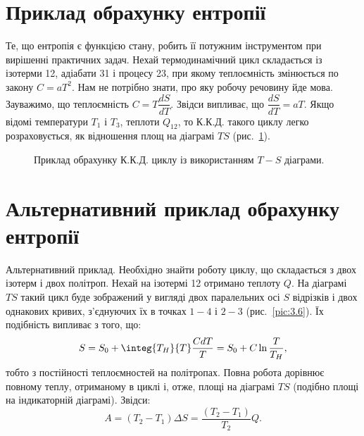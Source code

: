 \section{Приклад обрахунку ентропії}

Те, що ентропія є функцією стану, робить її потужним інструментом при вирішенні практичних задач.
Нехай термодинамічний цикл складається із ізотерми 12, адіабати 31 і процесу 23, при якому
теплоємність змінюється по закону $C=aT^2$. Нам не потрібно знати, про яку робочу речовину йде мова.
Зауважимо, що теплоємність $C = T \dfrac{dS}{dT}$. Звідси випливає, що $\dfrac{dS}{dT} = aT$. Якщо
відомі температури $T_1$ і $T_3$, теплоти $Q_{12}$, то К.К.Д. такого циклу легко розраховується, як
відношення площ на діаграмі $TS$ (рис.~\ref{tikz:3.6}).

\begin{figure}[h!]\centering

\caption{Приклад обрахунку К.К.Д. циклу із використанням $T-S$ діаграми.}
\label{tikz:3.6}
\end{figure}


\section{Альтернативний приклад обрахунку ентропії}

Альтернативний приклад. Необхідно знайти роботу циклу, що складається з двох ізотерм і двох політроп.
Нехай на ізотермі 12 отримано теплоту $Q$. На діаграмі $TS$ такий цикл буде зображений у вигляді двох
паралельних осі $S$ відрізків і двох однакових кривих, з'єднуючих їх в точках $1-4$ і $2-3$
(рис.~\ref{pic:3.6}). Їх подібність випливає з того, що:
\begin{equation*}
    S = S_0 + \integ{T_{H}}{T}\dfrac{CdT}{T} = S_0 + C\ln\dfrac{T}{T_H},
\end{equation*}
тобто з постійності теплоємностей на політропах. Повна робота дорівнює повному теплу, отриманому в циклі і, отже, площі на діаграмі $TS$ (подібно площі на індикаторній діаграмі). Звідси:
\begin{equation*}
    A=(T_2-T_1)\Delta S=\dfrac{(T_2-T_1)}{T_2}Q.
\end{equation*}

